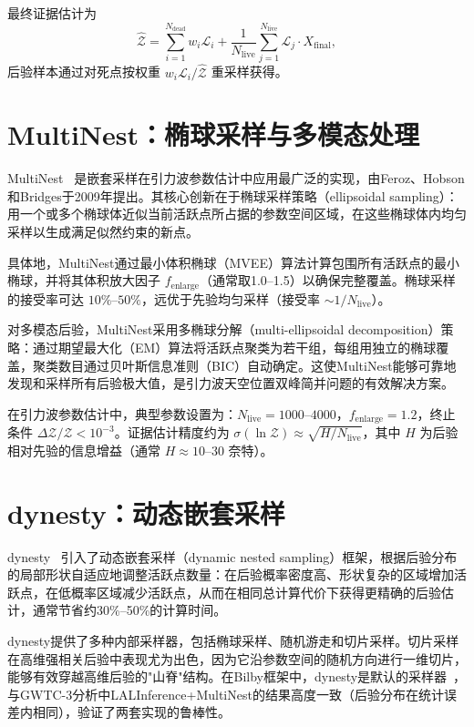 最终证据估计为
\begin{equation}
  \hat{\mathcal{Z}} = \sum_{i=1}^{N_\mathrm{dead}} w_i \mathcal{L}_i + \frac{1}{N_\mathrm{live}}\sum_{j=1}^{N_\mathrm{live}} \mathcal{L}_j \cdot X_\mathrm{final},
\end{equation}
后验样本通过对死点按权重 $w_i \mathcal{L}_i / \hat{\mathcal{Z}}$ 重采样获得。

\section{MultiNest：椭球采样与多模态处理}

MultiNest~\cite{Feroz2009MultiNest} 是嵌套采样在引力波参数估计中应用最广泛的实现，由Feroz、Hobson和Bridges于2009年提出。其核心创新在于椭球采样策略（ellipsoidal sampling）：用一个或多个椭球体近似当前活跃点所占据的参数空间区域，在这些椭球体内均匀采样以生成满足似然约束的新点。

具体地，MultiNest通过最小体积椭球（MVEE）算法计算包围所有活跃点的最小椭球，并将其体积放大因子 $f_\mathrm{enlarge}$（通常取1.0--1.5）以确保完整覆盖。椭球采样的接受率可达 $10\%$--$50\%$，远优于先验均匀采样（接受率 $\sim 1/N_\mathrm{live}$）。

对多模态后验，MultiNest采用多椭球分解（multi-ellipsoidal decomposition）策略：通过期望最大化（EM）算法将活跃点聚类为若干组，每组用独立的椭球覆盖，聚类数目通过贝叶斯信息准则（BIC）自动确定。这使MultiNest能够可靠地发现和采样所有后验极大值，是引力波天空位置双峰简并问题的有效解决方案。

在引力波参数估计中，典型参数设置为：$N_\mathrm{live} = 1000$--$4000$，$f_\mathrm{enlarge} = 1.2$，终止条件 $\Delta\mathcal{Z}/\mathcal{Z} < 10^{-3}$。证据估计精度约为 $\sigma(\ln\mathcal{Z}) \approx \sqrt{H/N_\mathrm{live}}$，其中 $H$ 为后验相对先验的信息增益（通常 $H \approx 10$--$30$ 奈特）。

\section{dynesty：动态嵌套采样}

dynesty~\cite{Speagle2020dynesty} 引入了动态嵌套采样（dynamic nested sampling）框架，根据后验分布的局部形状自适应地调整活跃点数量：在后验概率密度高、形状复杂的区域增加活跃点，在低概率区域减少活跃点，从而在相同总计算代价下获得更精确的后验估计，通常节省约30\%--50\%的计算时间。

dynesty提供了多种内部采样器，包括椭球采样、随机游走和切片采样。切片采样在高维强相关后验中表现尤为出色，因为它沿参数空间的随机方向进行一维切片，能够有效穿越高维后验的"山脊"结构。在Bilby框架中，dynesty是默认的采样器~\cite{Ashton2019Bilby}，与GWTC-3分析中LALInference+MultiNest的结果高度一致（后验分布在统计误差内相同），验证了两套实现的鲁棒性。

